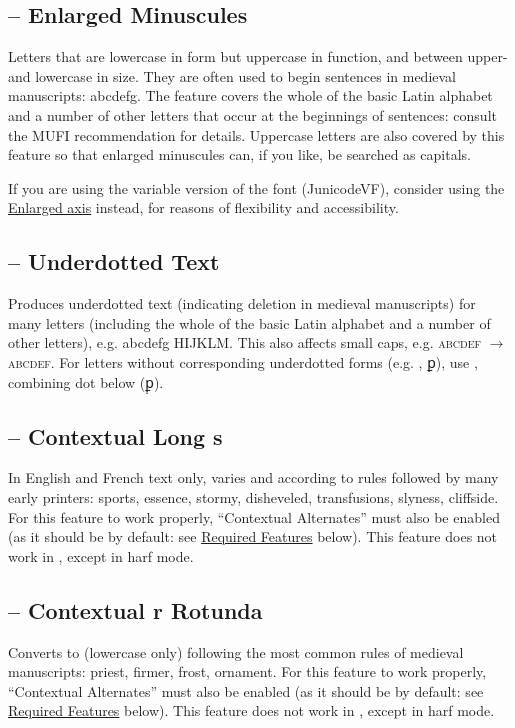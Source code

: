 \subsection{ --
Enlarged Minuscules}\hypertarget{ss06}{}
Letters that are lowercase in form but uppercase in function, and between upper- and
lowercase in size. They are often used to begin sentences in medieval manuscripts:
{abcdefg}. The feature
covers the whole of the basic Latin alphabet and a number of other letters that
occur at the beginnings of sentences: consult the MUFI recommendation for details.
Uppercase letters are also covered by this feature so that enlarged minuscules
can, if you like, be searched as capitals.

If you are using the variable version of the font (JunicodeVF), consider using the
\href{https://psb1558.github.io/Junicode-New/EnlargedAxis.html}{Enlarged axis} instead, for reasons of flexibility and
accessibility.

\subsection{ --
Underdotted Text}
Produces underdotted text (indicating deletion in medieval manuscripts) for many
letters (including
the whole of the basic Latin alphabet and a number of other letters), e.g.
{abcdefg HIJKLM}. This also affects small
caps, e.g. \textsc{abcdef} $\rightarrow $ {\textsc{abcdef}}.
For letters without corresponding underdotted forms (e.g. , ꝑ),
use , combining dot below (\hspace{0.2em}ꝑ̣).

\subsection{ --
Contextual Long s}
In English and French text only, varies  and  according to rules
followed by many early printers: {\colongs sports, essence, stormy, disheveled, transfusions, slyness, cliffside}. For this
feature to work properly,  ``Contextual Alternates'' must also be enabled (as it should be by
default: see \hyperlink{req}{Required Features} below). This feature does not work in {\ltech}, except in harf mode.

\subsection{ --
Contextual r Rotunda}\hypertarget{ss16}{}
Converts  to  (lowercase only) following the
most common rules of medieval manuscripts: {priest, firmer, frost, ornament}. For this feature to work properly,
 ``Contextual Alternates'' must also be enabled (as it should be by default: see
\hyperlink{req}{Required Features} below).  This feature does not work in {\ltech}, except in harf mode.

